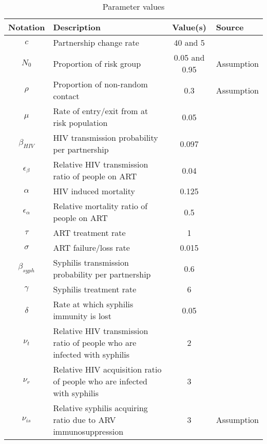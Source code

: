 \begin{table}[ht]
\caption{Parameter values}
\centering
\begin{tabular}{c p{2in} c l}
\hline 
Notation & Description & Value(s) & Source\\
\hline 
$c$ & Partnership change rate & 40 and 5 & \cite{garnett1997natural} \\
$N_0$ & Proportion of risk group & 0.05 and 0.95 & Assumption \\
$\rho$ & Proportion of non-random contact & 0.3 & Assumption\\
$\mu$ & Rate of entry/exit from at risk population & 0.05 & \cite{garnett1997natural} \\
$\beta_{HIV}$ & HIV transmission probability per partnership & 0.097 & \cite{grant1987infectivity}\\
$\epsilon_\beta$ & Relative HIV transmission ratio of people on ART & 0.04 & \cite{cohen2011prevention}\\
$\alpha$ & HIV induced mortality & 0.125 & \cite{champredon2013hiv}\\
$\epsilon_\alpha$ & Relative mortality ratio of people on ART & 0.5 & \cite{hiv2010effect}\\
$\tau$ & ART treatment rate & 1 & \cite{granich2009universal} \\
$\sigma$ & ART failure/loss rate & 0.015 & \cite{granich2009universal} \\
$\beta_{syph}$ & Syphilis transmission probability per partnership & 0.6 & \cite{garnett1997natural} \\
$\gamma$ & Syphilis treatment rate & 6 & \cite{grassly2005host} \\
$\delta$ & Rate at which syphilis immunity is lost & 0.05 & \cite{grassly2005host}\\
$\nu_t$ & Relative HIV transmission ratio of people who are infected with syphilis & 2 & \cite{deschamps1996heterosexual}\\
$\nu_r$ & Relative HIV acquisition ratio of people who are infected with syphilis & 3 & \cite{rottingen2001systematic}\\
$\nu_{is}$ & Relative syphilis acquiring ratio due to ARV immunosuppression & 3 & Assumption\\
\hline
\end{tabular}
\label{table:parmsTable}
\end{table}



